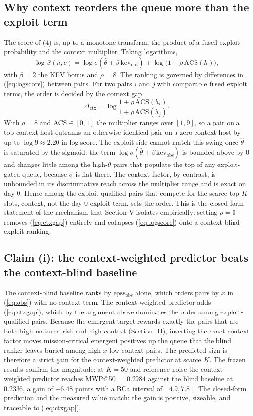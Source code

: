 \documentclass[journal]{IEEEtran}
\begin{document}
\subsection{Why context reorders the queue more than the exploit term}
The score of (4) is, up to a monotone transform, the product of a fused exploit probability and the
context multiplier. Taking logarithms,
\begin{equation}
\label{eq:logscore}
\log S(h,c) = \log \sigma(\hat\theta + \beta\,\mathrm{kev_{obs}}) + \log\big(1 + \rho\,\mathrm{ACS}(h)\big),
\end{equation}
with $\beta = 2$ the KEV bonus and $\rho = 8$. The ranking is governed by differences in
(\ref{eq:logscore}) between pairs. For two pairs $i$ and $j$ with comparable fused exploit terms,
the order is decided by the context gap
\begin{equation}
\label{eq:ctxgap}
\Delta_{\mathrm{ctx}} = \log\frac{1 + \rho\,\mathrm{ACS}(h_i)}{1 + \rho\,\mathrm{ACS}(h_j)}.
\end{equation}
With $\rho = 8$ and $\mathrm{ACS} \in [0,1]$ the multiplier ranges over $[1, 9]$, so a pair on a
top-context host outranks an otherwise identical pair on a zero-context host by up to
$\log 9 \approx 2.20$ in log-score. The exploit side cannot match this swing once $\hat\theta$ is
saturated by the sigmoid: the term $\log\sigma(\hat\theta + \beta\,\mathrm{kev_{obs}})$ is bounded
above by $0$ and changes little among the high-$\theta$ pairs that populate the top of any
exploit-gated queue, because $\sigma$ is flat there. The context factor, by contrast, is unbounded
in its discriminative reach across the multiplier range and is exact on day 0. Hence among the
exploit-qualified pairs that compete for the scarce top-$K$ slots, context, not the day-0 exploit
term, sets the order. This is the closed-form statement of the mechanism that Section V isolates
empirically: setting $\rho = 0$ removes (\ref{eq:ctxgap}) entirely and collapses
(\ref{eq:logscore}) onto a context-blind exploit ranking.

\subsection{Claim (i): the context-weighted predictor beats the context-blind baseline}
The context-blind baseline ranks by $\mathrm{epss_{obs}}$ alone, which orders pairs by $x$ in
(\ref{eq:obs}) with no context term. The context-weighted predictor adds (\ref{eq:ctxgap}), which
by the argument above dominates the order among exploit-qualified pairs. Because the emergent target
rewards exactly the pairs that are both high matured risk and high context (Section III), inserting
the exact context factor moves mission-critical emergent positives up the queue that the blind
ranker leaves buried among high-$x$ low-context pairs. The predicted sign is therefore a strict
gain for the context-weighted predictor at scarce $K$. The frozen results confirm the magnitude:
at $K = 50$ and reference noise the context-weighted predictor reaches MWP@50 $= 0.2984$ against the
blind baseline at $0.2336$, a gain of $+6.48$ points with a BCa interval of $[4.9, 7.8]$. The
closed-form prediction and the measured value match: the gain is positive, sizeable, and traceable
to (\ref{eq:ctxgap}).
\end{document}
